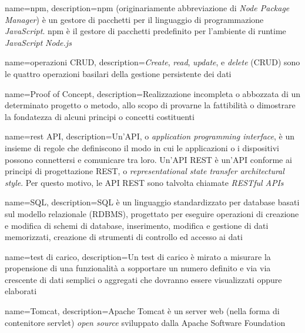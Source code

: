 {
    name=npm,
    description={npm (originariamente abbreviazione di \textit{Node Package Manager}) è un gestore di pacchetti per il linguaggio di programmazione \textit{JavaScript}. npm è il gestore di pacchetti predefinito per l'ambiente di runtime \textit{JavaScript} \textit{Node.js}}
}

{
    name=operazioni CRUD,
    description={\textit{Create}, \textit{read}, \textit{update}, e \textit{delete} (CRUD) sono le quattro operazioni basilari della gestione persistente dei dati}
}

{
    name=Proof of Concept,
    description={Realizzazione incompleta o abbozzata di un determinato progetto o metodo, allo scopo di provarne la fattibilità o dimostrare la fondatezza di alcuni principi o concetti costituenti}
}


{
    name=rest API,
    description={Un'API, o \textit{application programming interface}, è un insieme di regole che definiscono il modo in cui le applicazioni o i dispositivi possono connettersi e comunicare tra loro. Un'API REST è un'API conforme ai principi di progettazione REST, o \textit{representational state transfer architectural style}. Per questo motivo, le API REST sono talvolta chiamate \textit{RESTful APIs}}
}

{
    name=SQL,
    description={SQL è un linguaggio standardizzato per database basati sul modello relazionale (RDBMS), progettato per eseguire operazioni di creazione e modifica di schemi di database, inserimento, modifica e gestione di dati memorizzati, creazione di strumenti di controllo ed accesso ai dati}
}

{
    name=test di carico,
    description={Un test di carico è mirato a misurare la propensione di una funzionalità a sopportare un numero definito e via via crescente di dati semplici o aggregati che dovranno essere visualizzati oppure elaborati}
}

{
    name=Tomcat,
    description={Apache Tomcat è un server web (nella forma di contenitore servlet) \textit{open source} sviluppato dalla Apache Software Foundation}
}

